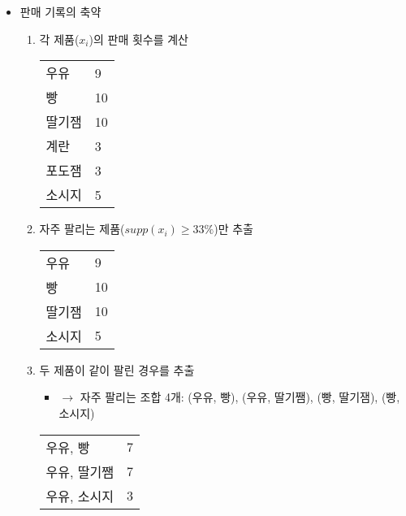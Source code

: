 \begin{itemize}
\begin{itemize}
	\item 판매 기록의 축약
		\begin{enumerate}
		\item 각 제품($x_{i}$)의 판매 횟수를 계산
			\begin{table}[htp]
			\begin{center}
			\begin{tabular}{ll}
			\toprule
			우유& 9 \\
			빵 & 10 \\
			딸기잼 & 10 \\
			계란 & 3 \\
			포도잼 & 3 \\
			소시지 & 5 \\
			\bottomrule
			\end{tabular}
			\end{center}
			\label{tab:allitems}
			\end{table}%
		\item 자주 팔리는 제품($supp(x_{i}) \geq 33\%$)만  추출		
			\begin{table}[htp]
			\begin{center}
			\begin{tabular}{ll}
			\toprule
			우유& 9 \\
			빵 & 10 \\
			딸기잼 & 10 \\
			소시지 & 5 \\
			\bottomrule
			\end{tabular}
			\end{center}
			\label{tab:featureditems}
			\end{table}%
		\item 두 제품이 같이 팔린 경우를 추출 
			\begin{itemize}
			\item $\rightarrow$ 자주 팔리는 조합 4개: (우유, 빵), (우유, 딸기쨈), (빵, 딸기잼), (빵, 소시지)
			\end{itemize}	
				\begin{table}[htp]
				\begin{center}
				\begin{tabular}{ll}
				\toprule
				우유, 빵 & 7 \\
				우유, 딸기쨈 & 7 \\
				우유, 소시지 & 3 \\

\end{tabular}
\end{center}
\end{table}
\end{enumerate}
\end{itemize}
\end{itemize}
